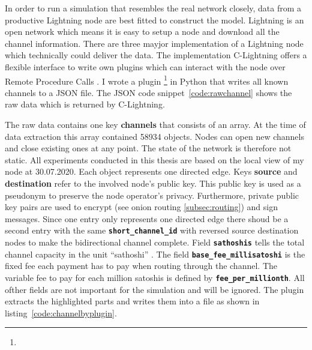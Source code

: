 \documentclass[final]{fhnwreport}       %
\begin{document}
In order to run a simulation that resembles the real network closely, data from a productive Lightning node are best fitted to construct the model. Lightning is an open network which means it is easy to setup a node and download all the channel information. There are three mayjor implementation of a Lightning node which technically could deliver the data. The implementation C-Lightning offers a flexible interface to write own plugins which can interact with the node over Remote Procedure Calls . I wrote a plugin \footnote{\gitpluginurl} in Python that writes all known channels to a JSON file. The JSON code snippet~\ref{code:rawchannel} shows the raw data which is returned by C-Lightning. 


The raw data contains one key \textbf{channels} that consists of an array. At the time of data extraction this array contained 58934 objects. Nodes can open new channels and close existing ones at any point. The state of the network is therefore not static. All experiments conducted in this thesis are based on the local view of my node at 30.07.2020. Each object represents one directed edge. Keys \textbf{source} and \textbf{destination} refer to the involved node's public key. This public key is used as a pseudonym to preserve the node operator's privacy. Furthermore, private public key pairs are used to encrypt (see onion routing \ref{subsec:routing}) and sign messages. Since one entry only represents one directed edge there shoud be a second entry with the same \textbf{\texttt{short\_channel\_id}} with reversed source destination nodes to make the bidirectional channel complete. Field \textbf{\texttt{sathoshis}} tells the total channel capacity in the unit ``sathoshi'' . The field \textbf{\texttt{base\_fee\_millisatoshi}} is the fixed fee each payment has to pay when routing through the channel. The variable fee to pay for each million satoshis is defined by \textbf{\texttt{fee\_per\_millionth}}. All ofther fields are not important for the simulation and will be ignored. The plugin extracts the highlighted parts and writes them into a file as shown in listing~\ref{code:channelbyplugin}. 
\end{document}
